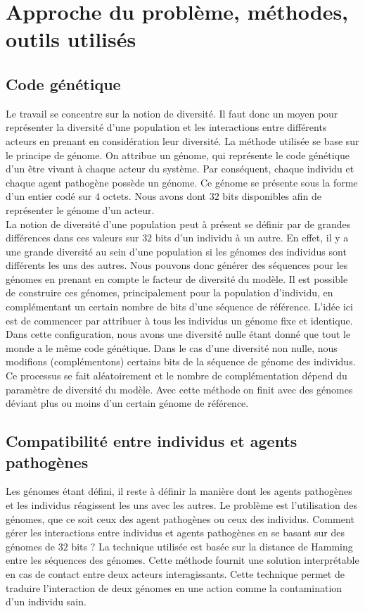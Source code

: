 \chapter{Approche du problème, méthodes, outils utilisés} \label{ch:approche}

\section{Code génétique}
Le travail se concentre sur la notion de diversité. Il faut donc un moyen pour représenter la diversité d'une population et les interactions entre différents acteurs en prenant en considération leur diversité. La méthode utilisée se base sur le principe de génome. On attribue un génome, qui représente le code génétique d'un être vivant à chaque acteur du système. Par conséquent, chaque individu et chaque agent pathogène possède un génome. Ce génome se présente sous la forme d'un entier codé sur $4$ octets. Nous avons dont $32$ bits disponibles afin de représenter le génome d'un acteur.\\ 

La notion de diversité d'une population peut à présent se définir par de grandes différences dans ces valeurs sur $32$ bits d'un individu à un autre. En effet, il y a une grande diversité au sein d'une population si les génomes des individus sont différents les uns des autres. Nous pouvons donc générer des séquences pour les génomes en prenant en compte le facteur de diversité du modèle. Il est possible de construire ces génomes, principalement pour la population d'individu, en complémentant un certain nombre de bits d'une séquence de référence. L'idée ici est de commencer par attribuer à tous les individus un génome fixe et identique. Dans cette configuration, nous avons une diversité nulle étant donné que tout le monde a le même code génétique. Dans le cas d'une diversité non nulle, nous modifions (complémentons) certains bits de la séquence de génome des individus. Ce processus se fait aléatoirement et le nombre de complémentation dépend du paramètre de diversité du modèle. Avec cette méthode on finit avec des génomes déviant plus ou moins d'un certain génome de référence.\\

\section{Compatibilité entre individus et agents pathogènes}
Les génomes étant défini, il reste à définir la manière dont les agents pathogènes et les individus réagissent les uns avec les autres. Le problème est l'utilisation des génomes, que ce soit ceux des agent pathogènes ou ceux des individus. Comment gérer les interactions entre individus et agents pathogènes en se basant sur des génomes de $32$ bits ? La technique utilisée est basée sur la distance de Hamming entre les séquences des génomes. Cette méthode fournit une solution interprétable en cas de contact entre deux acteurs interagissants. Cette technique permet de traduire l'interaction de deux génomes en une action comme la contamination d'un individu sain.\\

